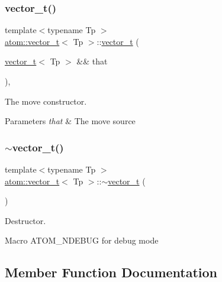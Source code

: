 \subsubsection{\texorpdfstring{vector\+\_\+t()}{vector\_t()}\hspace{0.1cm}{\footnotesize\ttfamily [3/3]}}
{\footnotesize\ttfamily template$<$typename Tp $>$ \\
\hyperlink{classatom_1_1vector__t}{atom\+::vector\+\_\+t}$<$ Tp $>$\+::\hyperlink{classatom_1_1vector__t}{vector\+\_\+t} (\begin{DoxyParamCaption}\item[{\hyperlink{classatom_1_1vector__t}{vector\+\_\+t}$<$ Tp $>$ \&\&}]{that }\end{DoxyParamCaption})\hspace{0.3cm}{\ttfamily [inline]}, {\ttfamily [noexcept]}}



The move constructor. 


\begin{DoxyParams}{Parameters}
{\em that} & The move source \\
\hline
\end{DoxyParams}
\mbox{\label{classatom_1_1vector__t_afa9985af7e737691bfd4fc2c876c3378}} 
\subsubsection{\texorpdfstring{$\sim$vector\+\_\+t()}{~vector\_t()}}
{\footnotesize\ttfamily template$<$typename Tp $>$ \\
\hyperlink{classatom_1_1vector__t}{atom\+::vector\+\_\+t}$<$ Tp $>$\+::$\sim$\hyperlink{classatom_1_1vector__t}{vector\+\_\+t} (\begin{DoxyParamCaption}{ }\end{DoxyParamCaption})\hspace{0.3cm}{\ttfamily [inline]}}



Destructor. 

Macro A\+T\+O\+M\+\_\+\+N\+D\+E\+B\+UG for debug mode 

\subsection{Member Function Documentation}
\mbox{\label{classatom_1_1vector__t_aa4355cec63c373a8af58c0c432a590c0}} 
